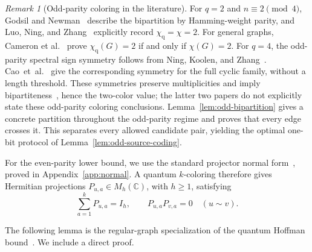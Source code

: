 \documentclass[11pt,a4paper]{article}
\numberwithin{equation}{section}
\numberwithin{figure}{section}
\numberwithin{table}{section}
\numberwithin{footnote}{section}
\theoremstyle{informal}\newtheorem*{informaltheorem}{Informal theorem}
\theoremstyle{definition}\newtheorem{example}{Example}[section]
\theoremstyle{remark}\newtheorem{remark}[theorem]{Remark}
\newcommand{\C}{\mathbb C}
\newcommand{\chq}{\chi_{\mathrm q}}
\begin{document}
\begin{remark}[Odd-parity coloring in the literature]\label{rem:odd-coloring-literature}
For \(q=2\) and \(n\equiv2\pmod4\), Godsil and
Newman~\cite[Sec.~2]{gn} describe the bipartition by Hamming-weight
parity, and Luo, Ning, and Zhang~\cite[Sec.~2]{lnz} explicitly
record \(\chq=\chi=2\). For general graphs, Cameron
et al.~\cite[Proposition~3]{cmnsw} prove
\(\chq(G)=2\) if and only if \(\chi(G)=2\).
For \(q=4\), the odd-parity spectral sign symmetry follows from
Ning, Koolen, and Zhang~\cite[Theorem~4.3 and Eq.~(45)]{nkz}.
\mbox{Cao~et~al.~\cite[Lemma~4.3]{cao}} give the corresponding symmetry
for the full cyclic family, without a length threshold.
These symmetries preserve multiplicities and imply
bipartiteness~\cite{bh}, hence the two-color value; the latter two
papers do not explicitly state these odd-parity coloring conclusions.
Lemma~\ref{lem:odd-bipartition} gives a concrete partition throughout
the odd-parity regime and proves that every edge crosses it. This
separates every allowed candidate pair, yielding the optimal one-bit
protocol of Lemma~\ref{lem:odd-source-coding}.
\end{remark}

For the even-parity lower bound, we use the standard projector normal
form~\cite[Proposition~1 and Eq.~(4)]{cmnsw}, proved in
Appendix~\ref{app:normal}. A quantum \(k\)-coloring therefore gives
Hermitian projections \(P_{u,a}\in M_h(\C)\), with \(h\geq1\), satisfying
\begin{equation}
 \sum_{a=1}^kP_{u,a}=I_h,\qquad
 P_{u,a}P_{v,a}=0\quad(u\sim v).
\end{equation}

The following lemma is the regular-graph specialization of the
quantum Hoffman bound~\cite[Secs.~5--6]{ew}. We include a direct proof.
\end{document}
